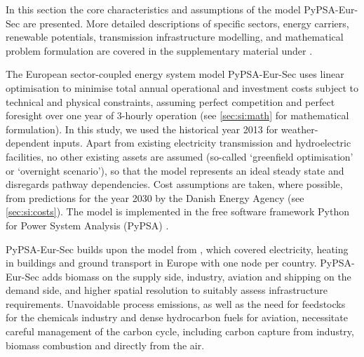 In this section the core characteristics and assumptions of the model
PyPSA-Eur-Sec are presented. More detailed descriptions of specific sectors,
energy carriers, renewable potentials, transmission infrastructure modelling,
and mathematical problem formulation are covered in the supplementary material
under .

The European sector-coupled energy system model PyPSA-Eur-Sec uses linear
optimisation to minimise total annual operational and investment costs subject
to technical and physical constraints, assuming perfect competition and perfect
foresight over one year of 3-hourly operation (see \cref{sec:si:math} for
mathematical formulation). In this study, we used the historical year 2013 for
weather-dependent inputs. Apart from existing electricity transmission and
hydroelectric facilities, no other existing assets are assumed (so-called
`greenfield optimisation' or `overnight scenario'), so that the model represents
an ideal steady state and disregards pathway dependencies.  Cost assumptions are
taken, where possible, from predictions for the year 2030 by the Danish Energy
Agency \cite{dea2019} (see \cref{sec:si:costs}). The model is implemented in the
free software framework Python for Power System Analysis (PyPSA)
\cite{brownPyPSAPython2018}.

PyPSA-Eur-Sec builds upon the model from \cite{brownSynergiesSector2018}, which
covered electricity, heating in buildings and ground transport in Europe with
one node per country. PyPSA-Eur-Sec adds biomass on the supply side, industry,
aviation and shipping on the demand side, and higher spatial resolution to
suitably assess infrastructure requirements. Unavoidable process emissions, as
well as the need for feedstocks for the chemicals industry and dense hydrocarbon
fuels for aviation, necessitate careful management of the carbon cycle,
including carbon capture from industry, biomass combustion and directly from the
air.

